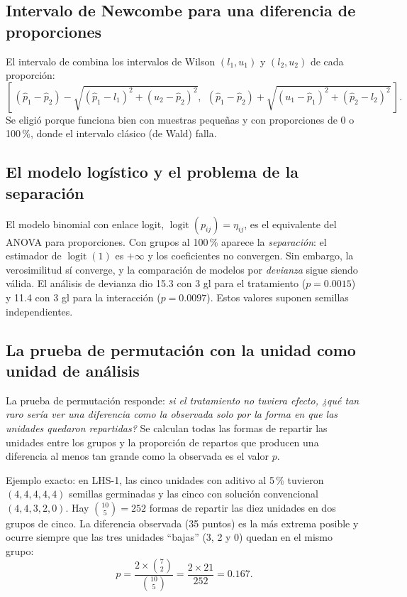 \documentclass[11pt]{article}
\begin{document}
\subsection{Intervalo de Newcombe para una diferencia de proporciones}

El intervalo de \citet{newcombe} combina los intervalos de Wilson $(l_1, u_1)$ y $(l_2, u_2)$ de cada proporción:
\[
\left[\, (\hat{p}_1 - \hat{p}_2) - \sqrt{(\hat{p}_1 - l_1)^2 + (u_2 - \hat{p}_2)^2},\ \
(\hat{p}_1 - \hat{p}_2) + \sqrt{(u_1 - \hat{p}_1)^2 + (\hat{p}_2 - l_2)^2} \,\right].
\]
Se eligió porque funciona bien con muestras pequeñas y con proporciones de 0 o 100\,\%, donde el intervalo clásico (de Wald) falla.

\subsection{El modelo logístico y el problema de la separación}

El modelo binomial con enlace logit, $\operatorname{logit}(p_{ij}) = \eta_{ij}$, es el equivalente del ANOVA para proporciones. Con grupos al 100\,\% aparece la \emph{separación}: el estimador de $\operatorname{logit}(1)$ es $+\infty$ y los coeficientes no convergen. Sin embargo, la verosimilitud sí converge, y la comparación de modelos por \emph{devianza} sigue siendo válida. El análisis de devianza dio 15.3 con 3 gl para el tratamiento ($p = 0.0015$) y 11.4 con 3 gl para la interacción ($p = 0.0097$). Estos valores suponen semillas independientes.

\subsection{La prueba de permutación con la unidad como unidad de análisis}

La prueba de permutación responde: \emph{si el tratamiento no tuviera efecto, ¿qué tan raro sería ver una diferencia como la observada solo por la forma en que las unidades quedaron repartidas?} Se calculan todas las formas de repartir las unidades entre los grupos y la proporción de repartos que producen una diferencia al menos tan grande como la observada es el valor $p$.

Ejemplo exacto: en LHS-1, las cinco unidades con aditivo al 5\,\% tuvieron $(4, 4, 4, 4, 4)$ semillas germinadas y las cinco con solución convencional $(4, 4, 3, 2, 0)$. Hay $\binom{10}{5} = 252$ formas de repartir las diez unidades en dos grupos de cinco. La diferencia observada (35 puntos) es la más extrema posible y ocurre siempre que las tres unidades ``bajas'' (3, 2 y 0) quedan en el mismo grupo:
\[
p = \frac{2 \times \binom{7}{2}}{\binom{10}{5}} = \frac{2 \times 21}{252} = 0.167 .
\]
\end{document}
